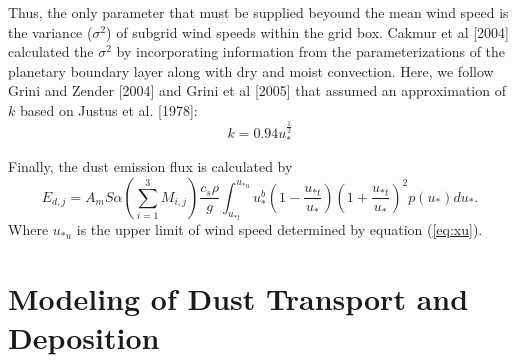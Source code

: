   Thus, the only parameter that must be supplied beyound the mean wind speed is the 
  variance ($\sigma^2$) of subgrid wind speeds within the grid box. Cakmur et al [2004] 
  calculated the $\sigma^2$ by incorporating information from the parameterizations of 
  the planetary boundary layer along with dry and moist convection. Here, we follow 
  Grini and Zender [2004] and Grini et al [2005] that assumed an approximation of $k$ 
  based on Justus et al. [1978]:
  \begin{equation}
  k = 0.94u_*^{\frac{1}{2}}
  \end{equation}

  Finally, the dust emission flux is calculated by
  \begin{equation} \label{eq:Edp}
  E_{d,j} = A_m S \alpha \left( \displaystyle{\sum_{i=1}^3 M_{i,j}} \right)
          \frac{c_s \rho}{g}
          \displaystyle \int_{u_{*t}}^{u_{*u}} 
          u_*^b\left(1-\frac{u_{*t}}{u_*}\right)
          \left(1+\frac{u_{*t}}{u_*}\right)^2 
          p(u_*) d u_* \mbox{.}
  \end{equation}  
  Where $u_{*u}$ is the upper limit of wind speed determined by equation (\ref{eq:xu}).
  

\section{Modeling of Dust Transport and Deposition}

